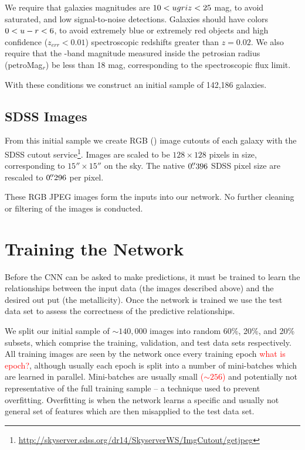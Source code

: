 \documentclass[fleqn,usenatbib]{mnras}
\newcommand{\editorial}[1]{\textcolor{red}{#1}}
\begin{document}
We require that galaxies magnitudes are $10 < \hbox{$u$} \hbox{$g$} \hbox{$r$} \hbox{$i$} \hbox{$z$} < 25$ mag, to avoid saturated, and low signal-to-noise detections. Galaxies should have colors $0 < \hbox{$u$}-\hbox{$r$} < 6$, to avoid extremely blue or extremely red objects and high confidence ($z_{err} < 0.01$) spectroscopic redshifts greater than $z=0.02$. We also require that the \sdssr-band magnitude measured inside the petrosian radius (petroMag$_r$) be less than 18 mag, corresponding to the spectroscopic flux limit.

With these conditions we construct an initial sample of 142,186 galaxies.

\subsection{SDSS Images}
From this initial sample we create RGB (\sdssi\sdssr\sdssg) image cutouts of each galaxy with the SDSS cutout service\footnote{\url{http://skyserver.sdss.org/dr14/SkyserverWS/ImgCutout/getjpeg}}. Images are scaled to be $128\times128$ pixels in size, corresponding to $15''\times15''$ on the sky. The native $0\hbox{$.\!\!^{\prime\prime}$}396$ SDSS pixel size are rescaled to $0\hbox{$.\!\!^{\prime\prime}$}296$ per pixel.

These RGB JPEG images form the inputs into our network. No further cleaning or filtering of the images is conducted.

\section{Training the Network}\label{sec:training}
Before the CNN can be asked to make predictions, it must be trained to learn the relationships between the input data (the images described above) and the desired out put (the metallicity). Once the network is trained we use the test data set to assess the correctness of the predictive relationships.

We split our initial sample of $\sim 140,000$ images into random 60\%, 20\%, and 20\% subsets, which comprise the training, validation, and test data sets respectively. All training images are seen by the network once every training epoch \editorial{what is epoch?}, although usually each epoch is split into a number of mini-batches which are learned in parallel. Mini-batches are usually small \editorial{($\sim256$)} and potentially not representative of the full training sample -- a technique used to prevent overfitting. Overfitting is when the network learns a specific and usually not general set of features which are then misapplied to the test data set.
\end{document}
